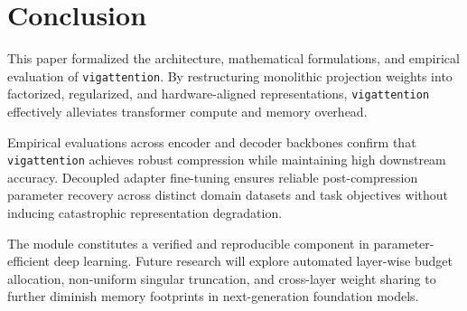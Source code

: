 \section{Conclusion}
This paper formalized the architecture, mathematical formulations, and empirical evaluation of \texttt{vigattention}. By restructuring monolithic projection weights into factorized, regularized, and hardware-aligned representations, \texttt{vigattention} effectively alleviates transformer compute and memory overhead.

Empirical evaluations across encoder and decoder backbones confirm that \texttt{vigattention} achieves robust compression while maintaining high downstream accuracy. Decoupled adapter fine-tuning ensures reliable post-compression parameter recovery across distinct domain datasets and task objectives without inducing catastrophic representation degradation.

The module constitutes a verified and reproducible component in parameter-efficient deep learning. Future research will explore automated layer-wise budget allocation, non-uniform singular truncation, and cross-layer weight sharing to further diminish memory footprints in next-generation foundation models.
